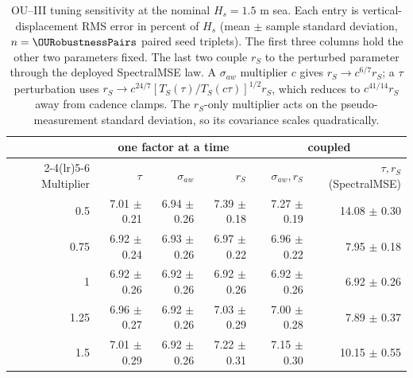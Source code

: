 
\begin{table}[t]
  \centering
  \caption{OU--III tuning sensitivity at the nominal $H_s=1.5$ m sea. Each entry is vertical-displacement RMS error in percent of $H_s$ (mean $\pm$ sample standard deviation, $n=\OURobustnessPairs$ paired seed triplets). The first three columns hold the other two parameters fixed. The last two couple $r_S$ to the perturbed parameter through the deployed SpectralMSE law. A $\sigma_{aw}$ multiplier $c$ gives $r_S\to c^{6/7}r_S$; a $\tau$ perturbation uses $r_S\to c^{24/7}[T_S(\tau)/T_S(c\tau)]^{1/2}r_S$, which reduces to $c^{41/14}r_S$ away from cadence clamps. The $r_S$-only multiplier acts on the pseudo-measurement standard deviation, so its covariance scales quadratically.}
  \label{tab:ou_robustness_sensitivity}
  \footnotesize
  \setlength{\tabcolsep}{7pt}
  \begin{tabular}{@{}rrrrrr@{}}
    \toprule
    & \multicolumn{3}{c}{one factor at a time} & \multicolumn{2}{c}{coupled} \\
    \cmidrule(lr){2-4}\cmidrule(lr){5-6}
    Multiplier & $\tau$ & $\sigma_{aw}$ & $r_S$ & $\sigma_{aw},r_S$ & $\tau,r_S$ (SpectralMSE) \\
    \midrule
    0.5 & 7.01 $\pm$ 0.21 & 6.94 $\pm$ 0.26 & 7.39 $\pm$ 0.18 & 7.27 $\pm$ 0.19 & 14.08 $\pm$ 0.30 \\
    0.75 & 6.92 $\pm$ 0.24 & 6.93 $\pm$ 0.26 & 6.97 $\pm$ 0.22 & 6.96 $\pm$ 0.22 & 7.95 $\pm$ 0.18 \\
    1 & 6.92 $\pm$ 0.26 & 6.92 $\pm$ 0.26 & 6.92 $\pm$ 0.26 & 6.92 $\pm$ 0.26 & 6.92 $\pm$ 0.26 \\
    1.25 & 6.96 $\pm$ 0.27 & 6.92 $\pm$ 0.26 & 7.03 $\pm$ 0.29 & 7.00 $\pm$ 0.28 & 7.89 $\pm$ 0.37 \\
    1.5 & 7.01 $\pm$ 0.29 & 6.92 $\pm$ 0.26 & 7.22 $\pm$ 0.31 & 7.15 $\pm$ 0.30 & 10.15 $\pm$ 0.55 \\
    \bottomrule
  \end{tabular}
\end{table}

